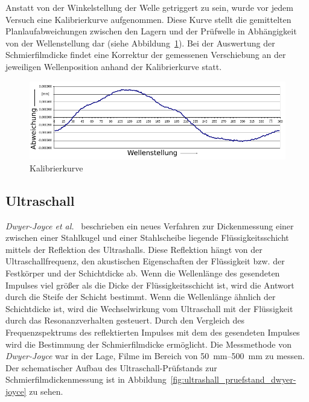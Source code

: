 Anstatt von der Winkelstellung der Welle getriggert zu sein, wurde vor jedem Versuch eine Kalibrierkurve aufgenommen.
Diese Kurve stellt die gemittelten Planlaufabweichungen zwischen den Lagern und der Prüfwelle in Abhängigkeit von der Wellenstellung dar (siehe Abbildung~\ref{fig:kalibrierkurve_kuhlmann}).
Bei der Auswertung der Schmierfilmdicke findet eine Korrektur der gemessenen Verschiebung an der jeweiligen Wellenposition anhand der Kalibrierkurve statt.

\begin{figure}[htb]
    \centering
    \includegraphics[]{./images/kalibrierkurve_kuhlmann.pdf}
    \caption{Kalibrierkurve~\cite{kuhlmann_2009}}
    \label{fig:kalibrierkurve_kuhlmann}
\end{figure}

\subsection{Ultraschall}
\label{sub:ultraschall}

\textit{Dwyer-Joyce et al.}~\cite{dwyer-joyce_2011} beschrieben ein neues Verfahren zur Dickenmessung einer zwischen einer Stahlkugel und einer Stahlscheibe liegende Flüssigkeitsschicht mittels der Reflektion des Ultrashalls.
Diese Reflektion hängt von der Ultraschallfrequenz, den akustischen Eigenschaften der Flüssigkeit bzw. der Festkörper und der Schichtdicke ab.
Wenn die Wellenlänge des gesendeten Impulses viel größer als die Dicke der Flüssigkeitsschicht ist, wird die Antwort durch die Steife der Schicht bestimmt.
Wenn die Wellenlänge ähnlich der Schichtdicke ist, wird die Wechselwirkung vom Ultraschall mit der Flüssigkeit durch das Resonanzverhalten gesteuert.
Durch den Vergleich des Frequenzspektrums des reflektierten Impulses mit dem des gesendeten Impulses wird die Bestimmung der Schmierfilmdicke ermöglicht.
Die Messmethode von \textit{Dwyer-Joyce} war in der Lage, Filme im Bereich von \SIrange{50}{500}{\milli\meter} zu messen.
Der schematischer Aufbau des Ultraschall-Prüfstands zur Schmierfilmdickenmessung ist in Abbildung~\ref{fig:ultrashall_pruefstand_dwyer-joyce} zu sehen.

